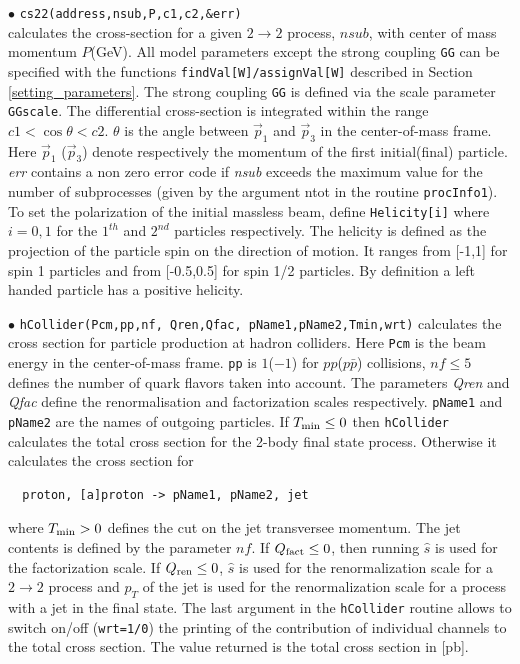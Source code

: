 \documentclass[12pt,a4paper]{article}
\begin{document}
{\noindent
$\bullet$ \verb|cs22(address,nsub,P,c1,c2,&err)|\\
calculates  the cross-section for a given $2\rightarrow 2$
process, $nsub$, with  center of mass momentum $P$(GeV). 
All model parameters  except the strong coupling {\tt GG}
can be specified with the functions {\tt findVal[W]/assignVal[W]}
described in Section \ref{setting_parameters}. The strong coupling {\tt GG}
is defined via the scale parameter {\tt GGscale}.    
The
differential cross-section is integrated
 within the range  $ c1 < \cos\theta <c2 $. $\theta$ is
the angle between $\vec{p}_1$ and $\vec{p}_3$  in the
center-of-mass frame. Here $\vec{p}_1$ ($\vec{p}_3$) denote
respectively the momentum of the first initial(final) particle.
{\it err} contains a non zero error code if {\it nsub} exceeds the
maximum value  for the number of subprocesses (given by the
argument ntot in the routine {\tt procInfo1}). To set the polarization 
of the initial massless beam, define   \verb|Helicity[i]|  where $i=0,1$ 
for the $1^{th}$ and $2^{nd}$ particles respectively.
The   helicity is defined as the projection of the particle spin
on the direction of motion. It ranges from  [-1,1] for spin 1 particles and 
from [-0.5,0.5]  for spin 1/2 particles.
By definition a left handed particle has a positive
helicity. 


\noindent$\bullet$ \verb|hCollider(Pcm,pp,nf, Qren,Qfac, pName1,pName2,Tmin,wrt)| 
calculates the cross
section for particle production at hadron colliders. Here \verb|Pcm| 
is the beam energy  in the center-of-mass frame. \verb|pp| is
$1$($-1$) for $pp$($p\bar{p}$) collisions, $ nf \le 5$  defines the
number of quark flavors taken into account.
The parameters  {\it Qren} and  {\it Qfac} define the renormalisation and factorization
 scales respectively. {\tt pName1} and {\tt pName2} are the names of outgoing
particles. If $T_{\rm min} \le 0 $ then {\tt hCollider} calculates the total  
cross section for the 2-body final state  process. Otherwise it calculates the cross
section for
\begin{verbatim}
  proton, [a]proton -> pName1, pName2, jet
\end{verbatim} 
where $ T_{\rm min}>0 $  defines the cut on the  jet transversee momentum. 
The jet contents is defined by the  parameter $nf$. 
If $Q_{\rm fact} \le 0 $, then  running  $\hat{s}$ is used for the
factorization  scale. If  $Q_{\rm ren} \le 0 $,  
$\hat{s}$ is used for the renormalization scale for a $2\to2$ process and $p_{T}$ of the jet is used for the renormalization scale for a process with a jet in the final state.
The last argument in the  {\tt hCollider} routine allows to switch
on/off ({\tt wrt=1/0}) the printing  of the contribution of individual channels to the total
cross section.   The value returned  is the total  cross section in [pb]. 


}
\end{document}

